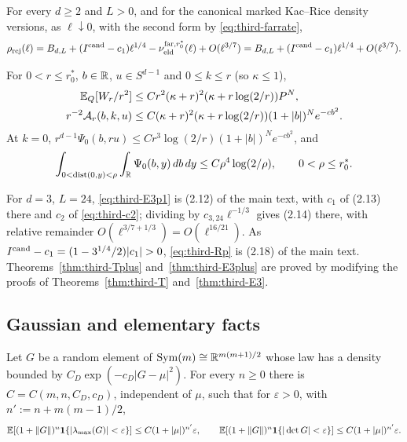 \begin{corollary}\label{cor:third-Rplus}
For every $d\ge2$ and $L>0$, and for the canonical marked Kac--Rice density versions, as $\ell\downarrow0$, with the second form by \eqref{eq:third-farrate},
\begin{equation}\label{eq:third-Rp}
\rho_{\mathrm{rej}}(\ell)=B_{d,L}+(I^{\mathrm{cand}}-c_1)\ell^{1/4}-\nu_{\mathrm{eld}}^{{\rm far},r_0^*}(\ell)+O(\ell^{3/7})=B_{d,L}+(I^{\mathrm{cand}}-c_1)\ell^{1/4}+O(\ell^{3/7}).
\end{equation}
\end{corollary}

\begin{proposition}\label{prop:third-window}
For $0<r\le r_0^*$, $b\in\mathbb R$, $u\in S^{d-1}$ and $0\le k\le r$ (so $\kappa\le1$),
\begin{align}
\mathbb E_Q[W_r/r^2]&\le Cr^2(\kappa+r)^2(\kappa+r\log(2/r))P^N,\label{eq:third-Wp1}\\
r^{-2}\mathcal A_r(b,k,u)&\le C(\kappa+r)^2(\kappa+r\log(2/r))(1+|b|)^Ne^{-cb^2}.\label{eq:third-Wp2}
\end{align}
At $k=0$, $r^{d-1}\Psi_0(b,ru)\le Cr^3\log(2/r)(1+|b|)^Ne^{-cb^2}$, and
\begin{equation}\label{eq:third-Wp3}
\int_{0<\operatorname{dist}(0,y)<\rho}\int_\mathbb R\Psi_0(b,y)\,db\,dy\le C\rho^4\log(2/\rho),\qquad 0<\rho\le r_0^*.
\end{equation}
\end{proposition}

\begin{remark}[the case $d=3$, $L=24$]\label{rem:third-main}
For $d=3$, $L=24$, \eqref{eq:third-E3p1} is (2.12) of the main text, with $c_1$ of (2.13) there and $c_2$ of \eqref{eq:third-c2}; dividing by $c_{3,24}\ell^{-1/3}$ gives (2.14) there, with relative remainder $O(\ell^{3/7+1/3})=O(\ell^{16/21})$. As $I^\cand-c_1=(1-3^{1/4}/2)|c_1|>0$, \eqref{eq:third-Rp} is (2.18) of the main text. Theorems~\ref{thm:third-Tplus} and~\ref{thm:third-E3plus} are proved by modifying the proofs of Theorems~\ref{thm:third-T} and~\ref{thm:third-E3}.
\end{remark}

\subsection{Gaussian and elementary facts}\label{ssec:third-gauss}

\begin{lemma}\label{lem:third-D}
Let $G$ be a random element of $\mathrm{Sym}(m)\cong\mathbb R^{m(m+1)/2}$ whose law has a density bounded by $C_D\exp(-c_D|G-\mu|^2)$. For every $n\ge0$ there is $C=C(m,n,C_D,c_D)$, independent of $\mu$, such that for $\varepsilon>0$, with $n':=n+m(m-1)/2$,
\begin{equation}\label{eq:third-D}
\mathbb E[(1+\|G\|)^n\mathbf 1\{|\lambda_{\max}(G)|<\varepsilon\}]\le C(1+|\mu|)^{n'}\varepsilon,\qquad \mathbb E[(1+\|G\|)^n\mathbf 1\{|\det G|<\varepsilon\}]\le C(1+|\mu|)^{n'}\varepsilon.
\end{equation}
\end{lemma}


